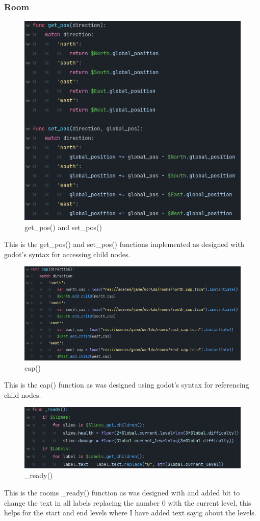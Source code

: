 \documentclass{article}
\begin{document}
        \subsubsection{Room}
        \begin{figure}[H]
                \centering
                \includegraphics[width = 0.8\columnwidth]{images/development/Room_pos.PNG}
                \caption{get\_pos() and set\_pos()}
        \end{figure}
        This is the get\_pos() and set\_pos() functions implemented as designed with godot's syntax for accessing child nodes.
        \begin{figure}[H]
                \centering
                \includegraphics[width = 0.8\columnwidth]{images/development/Room_cap.PNG}
                \caption{cap()}
        \end{figure}
        This is the cap() function as was designed using godot's syntax for referencing child nodes.\\
        \begin{figure}[H]
                \centering
                \includegraphics[width = 0.8\columnwidth]{images/development/Room_ready.PNG}
                \caption{\_ready()}
        \end{figure}
        This is the rooms \_ready() function as was designed with and added bit to change the text in all labels replacing the number 0 with the current level, this helps for the start and end levels where I have added text sayig about the levels.\\
\end{document}
